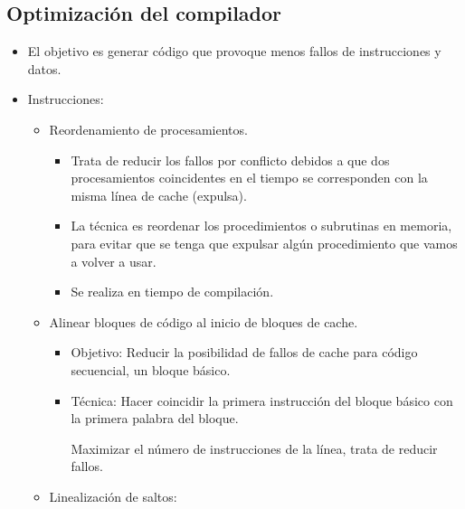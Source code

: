 \documentclass[12pt, twoside, openright]{report} %
\begin{document}
  \subsection{Optimización del compilador}

    \begin{itemize}
    
    \item
      El objetivo es generar código que provoque menos fallos de
      instrucciones y datos.
    \item
      Instrucciones:

      \begin{itemize}
      
      \item
        Reordenamiento de procesamientos.

        \begin{itemize}
        
        \item
          Trata de reducir los fallos por conflicto debidos a que dos
          procesamientos coincidentes en el tiempo se corresponden con
          la misma línea de cache (expulsa).
        \item
          La técnica es reordenar los procedimientos o subrutinas en
          memoria, para evitar que se tenga que expulsar algún
          procedimiento que vamos a volver a usar.
        \item
          Se realiza en tiempo de compilación.
        \end{itemize}
      \item
        Alinear bloques de código al inicio de bloques de cache.

        \begin{itemize}
        
        \item
          Objetivo: Reducir la posibilidad de fallos de cache para
          código secuencial, un bloque básico.
        \item
          Técnica: Hacer coincidir la primera instrucción del bloque
          básico con la primera palabra del bloque.

          
          
            Maximizar el número de instrucciones de la línea, trata de
            reducir fallos.

          \end{itemize}
      \item
        Linealización de saltos:


\end{itemize}
\end{itemize}
\end{document}

